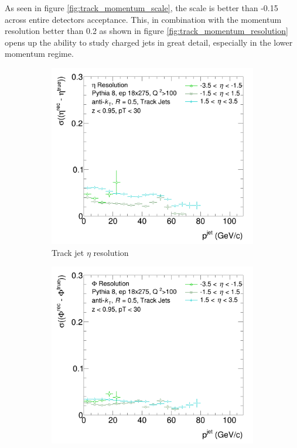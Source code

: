 As seen in figure \ref{fig:track_momentum_scale}, the scale is better than -0.15 across entire detectors acceptance.  This, in combination with the momentum resolution better than 0.2 as shown in figure \ref{fig:track_momentum_resolution} opens up the ability to study charged jets in great detail, especially in the lower momentum regime.  

\begin{figure}
    \centering
    \begin{subfigure}{0.4\textwidth}
        \centering
        \includegraphics[width=\linewidth]{figs/jet_plots/EtaReso_track_grouped.png}
        \caption{Track jet $\eta$ resolution}
        \label{fig:track_eta_resolution}
    \end{subfigure}
    \hfill
    \begin{subfigure}{0.4\textwidth}
        \centering
        \includegraphics[width=\linewidth]{figs/jet_plots/PhiReso_track_grouped.png}

\end{subfigure}
\end{figure}
